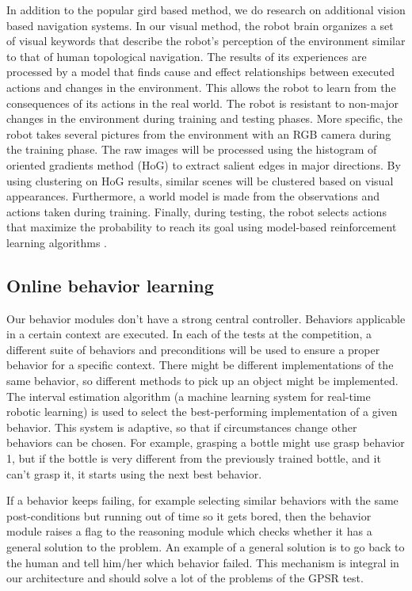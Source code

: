 \documentclass[runningheads,a4paper]{llncs}
\begin{document}
In addition to the popular gird based method, we do research on additional vision based navigation systems.
In our visual method, the robot brain organizes a set of visual keywords that describe the robot's perception of the environment similar to that of human topological navigation. 
The results of its experiences are processed by a model that finds cause and effect relationships between executed actions and changes in the environment. 
This allows the robot to learn from the consequences of its actions in the real world. 
The robot is resistant to non-major changes in the environment during training and testing phases. 
More specific, the robot takes several pictures from the environment with an RGB camera during the training phase. 
The raw images will be processed using the histogram of oriented gradients method (HoG) to extract salient edges in major directions. 
By using clustering on HoG results, similar scenes will be clustered based on visual appearances. 
Furthermore, a world model is made from the observations and actions taken during training. 
Finally, during testing, the robot selects actions that maximize the probability to reach its goal using model-based reinforcement learning algorithms \cite{hognav}.

\subsection{Online behavior learning}
\label{sec:online_bahavior}

Our behavior modules don't have a strong central controller. 
Behaviors applicable in a certain context are executed. 
In each of the tests at the competition, a different suite of behaviors and preconditions will be used to ensure a proper behavior for a specific context. 
There might be different implementations of the same behavior, so different methods to pick up an object might be implemented. 
The interval estimation algorithm \cite{Zant2005} (a machine learning system for real-time robotic learning) is used to select the best-performing implementation of a given behavior. 
This system is adaptive, so that if circumstances change other behaviors can be chosen. 
For example, grasping a bottle might use grasp behavior 1, but if the bottle is very different from the previously trained bottle, and it can't grasp it, it starts using the next best behavior.

If a behavior keeps failing, for example selecting similar behaviors with the same post-conditions but running out of time so it gets bored, then the behavior module raises a flag to the reasoning module which checks whether it has a general solution to the problem. 
An example of a general solution is to go back to the human and tell him/her which behavior failed.
This mechanism is integral in our architecture and should solve a lot of the problems of the GPSR test.
\end{document}
